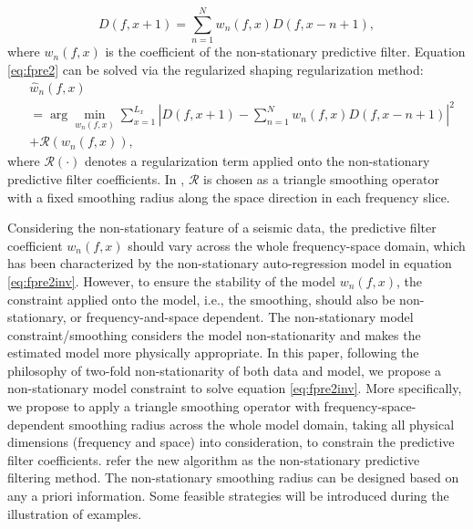 \begin{equation}
\label{eq:fpre22}
D(f,x+1)=\sum_{n=1}^{N}w_n(f,x)D(f,x-n+1),
\end{equation}
where $w_n(f,x)$ is the coefficient of the non-stationary predictive filter. Equation \ref{eq:fpre2} can be solved via the regularized shaping regularization method:
\begin{equation}
\label{eq:fpre2inv}
\begin{split}
&\hat{w}_n(f,x) \\
&=\arg \min_{w_n(f,x)} \sum_{x=1}^{L_x}| D(f,x+1)-\sum_{n=1}^{N}w_n(f,x)D(f,x-n+1)|^2 \\
&+ \mathcal{R}(w_n(f,x)),
\end{split}
\end{equation}
where $\mathcal{R}(\cdot)$ denotes a regularization term applied onto the non-stationary predictive filter coefficients.  In \cite{guochang2012}, $\mathcal{R}$ is chosen as a triangle smoothing operator with a fixed smoothing radius along the space direction in each frequency slice.

Considering the non-stationary feature of a seismic data, the predictive filter coefficient $w_n(f,x)$ should vary across the whole frequency-space domain, which has been characterized by the non-stationary auto-regression model in equation \ref{eq:fpre2inv}. However, to ensure the stability of the model $w_n(f,x)$, the constraint applied onto the model, i.e., the smoothing, should also be non-stationary, or frequency-and-space dependent. The non-stationary model constraint/smoothing considers the model non-stationarity and makes the estimated model more physically appropriate. In this paper, following the philosophy of two-fold non-stationarity of both data and model, we propose a non-stationary model constraint to solve equation \ref{eq:fpre2inv}. More specifically, we propose to apply a triangle smoothing operator with frequency-space-dependent smoothing radius across the whole model domain, taking all physical dimensions (frequency and space) into consideration, to constrain the predictive filter coefficients.  refer the new algorithm as the non-stationary predictive filtering method.  The non-stationary smoothing radius can be designed based on any a priori information. Some feasible strategies will be introduced during the illustration of examples.


